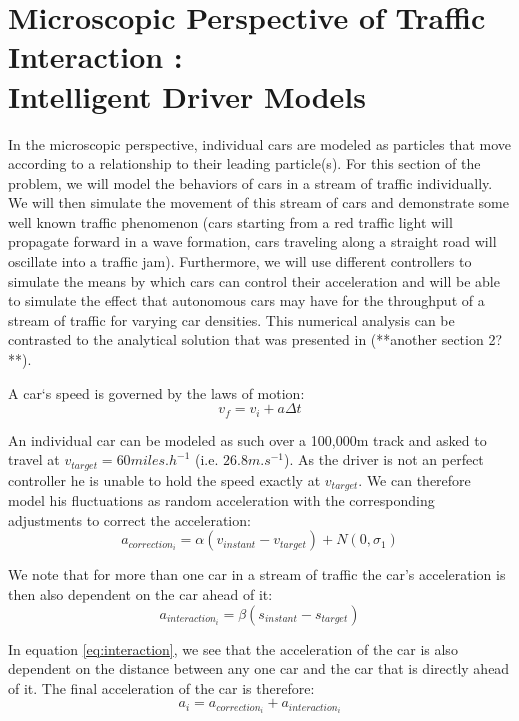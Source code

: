 \documentclass[11pt]{article}
\begin{document}
\section{Microscopic Perspective of Traffic Interaction : \\Intelligent Driver Models}
In the microscopic perspective, individual cars are modeled as particles that move according to a relationship to their leading particle(s).
For this section of the problem, we will model the behaviors of cars in a stream of traffic individually. We will then simulate the movement of this stream of cars and demonstrate some well known traffic phenomenon (cars starting from a red traffic light will propagate forward in a wave formation, cars traveling along a straight road will oscillate into a traffic jam). Furthermore, we will use different controllers to simulate the means by which cars can control their acceleration and will be able to simulate the effect that autonomous cars may have for the throughput of a stream of traffic for varying car densities. This numerical analysis can be contrasted to the analytical solution that was presented in (**another section 2?**).\par
A car`s speed is governed by the laws of motion:
\begin{equation}
v_f = v_i + a\Delta t
\end{equation}

An individual car can be modeled as such over a 100,000m track and asked to travel at $v_{target} = 60miles.h^{-1}$ (i.e. $26.8m.s^{-1}$). As the driver is not an perfect controller he is unable to hold the speed exactly at $v_{target}$. We can therefore model his fluctuations as random acceleration with the corresponding adjustments to correct the acceleration:
\begin{equation}
a_{correction_i} = \alpha(v_{instant} - v_{target}) + N(0,\sigma_1)
\end{equation}

We note that for more than one car in a stream of traffic the car's acceleration is then also dependent on the car ahead of it:
\begin{equation}\label{eq:interaction}
a_{interaction_i} = \beta (s_{instant} - s_{target})
\end{equation}

In equation \ref{eq:interaction}, we see that the acceleration of the car is also dependent on the distance between any one car and the car that is directly ahead of it. The final acceleration of the car is therefore:
\begin{equation}\label{eq:acceleration}
a_{i} = a_{correction_i} + a_{interaction_i}
\end{equation}
\end{document}
